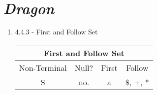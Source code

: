 \documentclass[letterpaper, 10pt]{article}
\begin{document}
\section{\textit{Dragon}}

\begin{enumerate}

    \item  4.4.3 - First and Follow Set\\
    
    \begin{tabular}{ | c || c | c | c |  }
    \hline
    \multicolumn{4}{|c|}{First and Follow Set} \\
    \hline
     Non-Terminal & Null? & First & Follow\\
    \hline\hline
    S & no. & {a} & {\$, +, *} \\
    \hline
    \end{tabular}
    
\end{enumerate}
\end{document}
